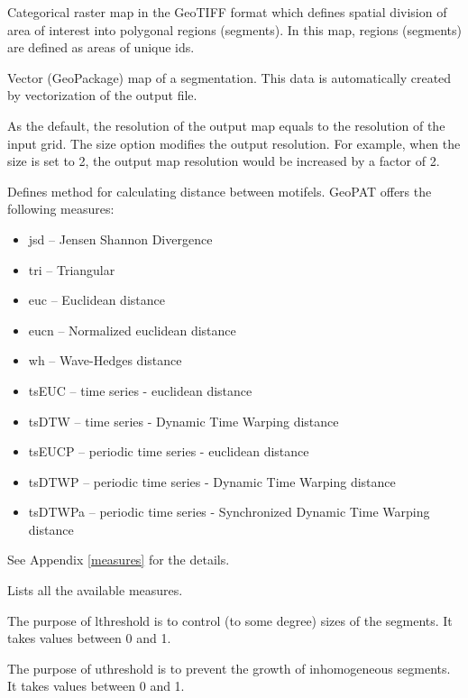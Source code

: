 Categorical raster map in the GeoTIFF format which defines spatial division of area of interest into polygonal regions (segments).
In this map, regions (segments) are defined as areas of unique ids.


Vector (GeoPackage) map of a segmentation.
This data is automatically created by vectorization of the output file.


As the default, the resolution of the output map equals to the resolution of the input grid.
The size option modifies the output resolution.
For example, when the size is set to 2, the output map resolution would be increased by a factor of 2.


Defines method for calculating distance between motifels. 
GeoPAT offers the following measures: 
\begin{itemize}
	\item jsd -- Jensen Shannon Divergence
	\item tri -- Triangular
	\item euc -- Euclidean distance
	\item eucn -- Normalized euclidean distance
	\item wh -- Wave-Hedges distance
	\item tsEUC -- time series - euclidean distance
	\item tsDTW -- time series - Dynamic Time Warping distance
	\item tsEUCP -- periodic time series - euclidean distance
	\item tsDTWP -- periodic time series - Dynamic Time Warping distance
	\item tsDTWPa -- periodic time series - Synchronized Dynamic Time Warping distance
\end{itemize}
See Appendix \ref{measures} for the details.


Lists all the available measures. 


The purpose of lthreshold is to control (to some degree) sizes of the segments. 
It takes values between 0 and 1.


The purpose of uthreshold is to prevent the growth of inhomogeneous segments.
It takes values between 0 and 1.

